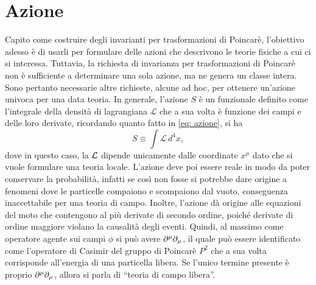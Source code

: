 \chapter{Azione}
Capito come costruire degli invarianti per trasformazioni di Poincarè, l'obiettivo adesso è di usarli per formulare delle azioni che descrivono le teorie fisiche a cui ci si interessa. Tuttavia, la richiesta di invarianza per trasformazioni di Poincarè non è sufficiente a determinare una sola azione, ma ne genera un classe intera. Sono pertanto necessarie altre richieste, alcune ad hoc, per ottenere un'azione univoca per una data teoria. In generale, l'azione $S$ è un funzionale definito come l'integrale della densità di lagrangiana $\mathcal{L}$ che a sua volta è funzione dei campi e delle loro derivate, ricordando quanto fatto in \eqref{eq: azione}, si ha
\begin{equation}
    S \equiv \int\mathcal{L}\,d^4x,
\end{equation}
dove in questo caso, la $\mathcal{L}$ dipende unicamente dalle coordinate $x^\mu$ dato che si vuole formulare una teoria locale. L'azione deve poi essere reale in modo da poter conservare la probabilità, infatti se così non fosse si potrebbe dare origine a fenomeni dove le particelle compaiono e scompaiono dal vuoto, conseguenza inaccettabile per una teoria di campo. Inoltre, l'azione dà origine alle equazioni del moto che contengono al più derivate di secondo ordine, poiché derivate di ordine maggiore violano la causalità degli eventi. Quindi, al massimo come operatore agente sui campi $\phi$ si può avere $\partial^\mu\partial_\mu$, il quale può essere identificato come l'operatore di Casimir del gruppo di Poincarè $P^2$ che a sua volta corrisponde all'energia di una particella libera. Se l'unico termine presente è proprio $\partial^\mu\partial_\mu$, allora si parla di ``teoria di campo libera''. 

